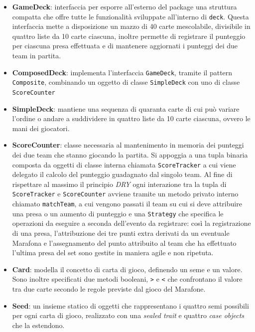 \begin{itemize}
	
	\item{\textbf{GameDeck}}: interfaccia per esporre all'esterno del package una struttura compatta che offre tutte le funzionalità sviluppate all'interno di \texttt{deck}. Questa interfaccia mette a disposizione un mazzo di 40 carte mescolabile, divisibile in quattro liste da 10 carte ciascuna, inoltre permette di registrare il punteggio per ciascuna presa effettuata e di mantenere aggiornati i punteggi dei due team in partita.
	
	\item{\textbf{ComposedDeck}}: implementa l'interfaccia \texttt{GameDeck}, tramite il pattern \texttt{Composite}, combinando un oggetto di classe \texttt{SimpleDeck} con uno di classe \texttt{ScoreCounter}
	
	\item{\textbf{SimpleDeck}}: mantiene una sequenza di quaranta carte di cui può variare l'ordine o andare a suddividere in quattro liste da 10 carte ciascuna, ovvero le mani dei giocatori.
	
	\item{\textbf{ScoreCounter}}: classe necessaria al mantenimento in memoria dei punteggi dei due team che stanno giocando la partita. Si appoggia a una tupla binaria composta da oggetti di classe 
	interna chiamata \texttt{ScoreTracker} a cui viene delegato il calcolo del punteggio guadagnato dal singolo team. Al fine di rispettare al massimo il principio \textit{DRY} ogni interazione tra la tupla di \texttt{ScoreTracker} e \texttt{ScoreCounter} avviene tramite un metodo privato interno chiamato \texttt{matchTeam}, a cui vengono passati il team su cui si deve attribuire una presa o un aumento di punteggio e una \texttt{Strategy} che specifica le operazioni da eseguire a seconda dell'evento da registrare: così la registrazione di una presa, l'attribuzione dei tre punti extra derivati da un eventuale Marafona e l'assegnamento del punto attribuito al team che ha effettuato l'ultima presa del set sono gestite in maniera agile e non ripetuta.
	
	\item{\textbf{Card}}: modella il concetto di carta di gioco, definendo un seme e un valore.
	Sono inoltre specificati due metodi booleani, \texttt{>} e \texttt{<} che confrontano il valore tra due carte secondo le regole previste dal gioco del Marafone.
	
	\item{\textbf{Seed}}: un insieme statico di oggetti che rappresentano i quattro semi possibili per ogni carta di gioco, realizzato con una \textit{sealed trait}  e quattro \textit{case objects} che la estendono.
	 

\end{itemize}
